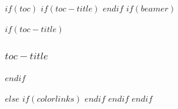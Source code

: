 \documentclass[
$if(fontsize)$
  $fontsize$,
$endif$
$for(classoption)$
  $classoption$$sep$,
$endfor$
a4paper]{$documentclass$}
\theoremstyle{thmstyleone}%
\theoremstyle{thmstyletwo}%
\theoremstyle{thmstylethree}%
\begin{document}
% 
% 
% 




\maketitle


$if(toc)$
$if(toc-title)$
\renewcommand*\contentsname{$toc-title$}
$endif$
$if(beamer)$
\begin{frame}[allowframebreaks]
$if(toc-title)$
  \frametitle{$toc-title$}
$endif$
  \tableofcontents[hideallsubsections]
\end{frame}
$else$
{
$if(colorlinks)$
\hypersetup{linkcolor=$if(toccolor)$$toccolor$$else$$endif$}
$endif$
\setcounter{tocdepth}{$toc-depth$}
\tableofcontents
}
$endif$
$endif$
\end{document}
